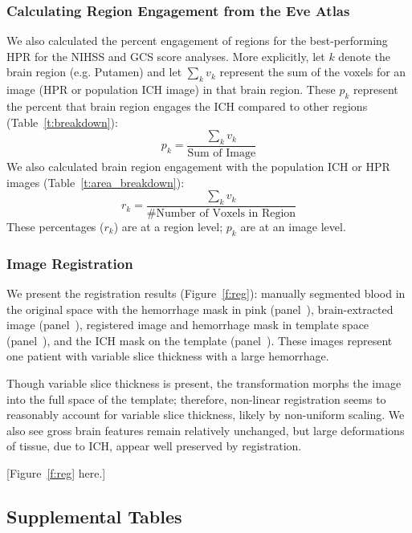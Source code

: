 \documentclass[10pt]{article}\usepackage[]{graphicx}\usepackage[]{color}
\begin{document}
\subsubsection{Calculating Region Engagement from the Eve Atlas}
\label{sec:calc_perc}
We also calculated the percent engagement of regions for the best-performing HPR for the NIHSS and GCS score analyses.
More explicitly, let $k$ denote the brain region (e.g. Putamen) and let $\sum_{k} v_{k}$ represent the sum of the voxels for an image (HPR or population ICH image) in that brain region. These $p_{k}$ represent the percent that brain region engages the ICH compared to other regions (Table~\ref{t:breakdown}):
$$
  p_{k} = \frac{\sum_{k} v_{k}}{\text{Sum of Image}}
$$
We also calculated brain region engagement with the population ICH or HPR images (Table~\ref{t:area_breakdown}):
$$
	r_{k} = \frac{\sum_{k} v_{k}}{\# \text{Number of Voxels in Region}}
$$
These percentages ($r_{k}$) are at a region level; $p_k$ are at an image level.



\subsubsection{Image Registration}


We present the registration results (Figure~\ref{f:reg}):  manually segmented blood in the original space with the hemorrhage mask in pink (panel~\protect{}), brain-extracted image (panel~\protect{}), registered image and hemorrhage mask in template space (panel~\protect{}), and the ICH mask on the template (panel~\protect{}).  These images represent one patient with variable slice thickness with a large hemorrhage.

Though variable slice thickness is present, the transformation morphs the image into the full space of the template; therefore, non-linear registration seems to reasonably account for variable slice thickness, likely by non-uniform scaling.
We also see gross brain features remain relatively unchanged, but large deformations of tissue, due to ICH, appear well preserved by registration.  

[Figure~\ref{f:reg} here.]



\newpage

\subsection{Supplemental Tables}

\end{document}
